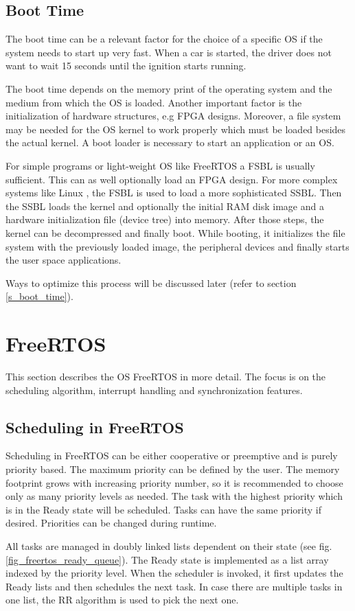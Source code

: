 \subsection{Boot Time}\label{ss_boot_time_general}
The boot time can be a relevant factor for the choice of a specific \ac{OS} if the system needs to start up very fast.
When a car is started, the driver does not want to wait 15 seconds until the ignition starts running.
\par
The boot time depends on the memory print of the operating system and the medium from which the \ac{OS} is loaded.
Another important factor is the initialization of hardware structures, e.g \ac{FPGA} designs.
Moreover, a file system may be needed for the \ac{OS} kernel to work properly which must be loaded besides the actual kernel. 
A boot loader is necessary to start an application or an \ac{OS}.
\par
For simple programs or light-weight \ac{OS} like FreeRTOS a \ac{FSBL} is usually sufficient.
This can as well optionally load an \ac{FPGA} design.
For more complex systems like Linux \cite{jones:itlbp}, the \ac{FSBL} is used to load a more sophisticated \ac{SSBL}.
Then the \ac{SSBL} loads the kernel and optionally the initial RAM disk image and a hardware initialization file (device tree) into memory.
After those steps, the kernel can be decompressed and finally boot.
While booting, it initializes the file system with the previously loaded image, the peripheral devices and finally starts the user space applications. 
\par
Ways to optimize this process will be discussed later (refer to section \ref{s_boot_time}).

\section{FreeRTOS}
This section describes the \ac{OS} FreeRTOS in more detail.
The focus is on the scheduling algorithm, interrupt handling and synchronization features.

\subsection{Scheduling in FreeRTOS}\label{ss_scheduling_in_freertos}
Scheduling in FreeRTOS \cite{freertos} can be either cooperative or preemptive and is purely priority based.
The maximum priority can be defined by the user. 
The memory footprint grows with increasing priority number, so it is recommended to choose only as many priority levels as needed.
The task with the highest priority which is in the Ready state will be scheduled. 
Tasks can have the same priority if desired.
Priorities can be changed during runtime.
\par
All tasks are managed in doubly linked lists dependent on their state (see fig. \ref{fig_freertos_ready_queue}). 
The Ready state is implemented as a list array indexed by the priority level. 
When the scheduler is invoked, it first updates the Ready lists and then schedules the next task.
In case there are multiple tasks in one list, the \ac{RR} algorithm is used to pick the next one.

